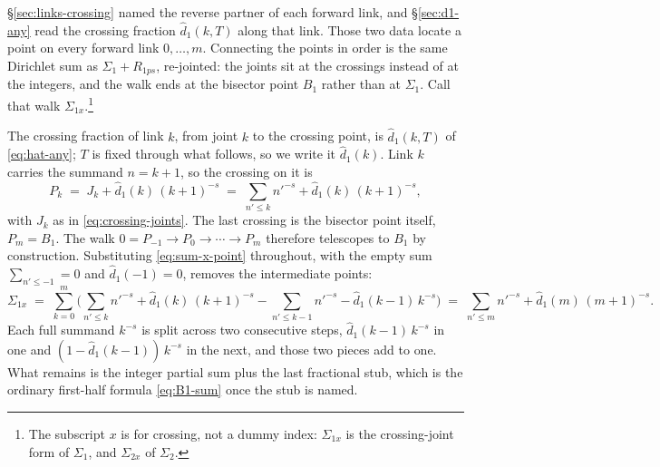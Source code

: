 \documentclass[11pt]{article}
\theoremstyle{definition}
\begin{document}
\S\ref{sec:links-crossing} named the reverse partner of each forward link, and
\S\ref{sec:d1-any} read the crossing fraction \(\hat d_1(k,T)\) along that
link. Those two data locate a point on every forward link \(0,\dots,m\).
Connecting the points in order is the same Dirichlet sum as
\(\Sigma_1+R_{1ps}\), re-jointed: the joints sit at the crossings instead of
at the integers, and the walk ends at the bisector point \(B_1\) rather than
at \(\Sigma_1\). Call that walk \(\Sigma_{1x}\).\footnote{The subscript \(x\) is for crossing, not a dummy index: \(\Sigma_{1x}\) is the crossing-joint form of \(\Sigma_1\), and \(\Sigma_{2x}\) of \(\Sigma_2\).}

The crossing fraction of link \(k\), from joint \(k\) to the crossing point,
is \(\hat d_1(k,T)\) of \eqref{eq:hat-any}; \(T\) is fixed
through what follows, so we write it \(\hat d_1(k)\). Link \(k\) carries the
summand \(n=k+1\), so the crossing on it is
\begin{equation}\label{eq:sum-x-point}
P_k
\;=\;
J_k+\hat d_1(k)\,(k+1)^{-s}
\;=\;
\sum_{n'\le k}n'^{-s}+\hat d_1(k)\,(k+1)^{-s},
\end{equation}
with \(J_k\) as in \eqref{eq:crossing-joints}. The last crossing is the
bisector point itself, \(P_m=B_1\). The walk
\(0=P_{-1}\to P_0\to\cdots\to P_m\) therefore telescopes to \(B_1\) by
construction. Substituting \eqref{eq:sum-x-point} throughout, with the empty
sum \(\sum_{n'\le-1}=0\) and \(\hat d_1(-1)=0\), removes the intermediate points:
\begin{equation}\label{eq:sum-1x}
\Sigma_{1x}
\;=\;
\sum_{k=0}^{m}\Biggl(
\sum_{n'\le k}n'^{-s}+\hat d_1(k)\,(k+1)^{-s}
-\sum_{n'\le k-1}n'^{-s}-\hat d_1(k-1)\,k^{-s}
\Biggr)
\;=\;
\sum_{n'\le m}n'^{-s}+\hat d_1(m)\,(m+1)^{-s}.
\end{equation}
Each full summand \(k^{-s}\) is split across two consecutive steps,
\(\hat d_1(k-1)\,k^{-s}\) in one and \((1-\hat d_1(k-1))\,k^{-s}\) in the next, and those
two pieces add to one. What remains is the integer partial sum plus the last
fractional stub, which is the ordinary first-half formula
\eqref{eq:B1-sum} once the stub is named.
\end{document}
